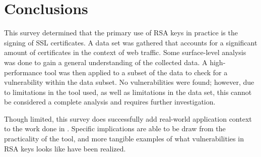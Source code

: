 \documentclass{acm_proc_article-sp}
\begin{document}
\section{Conclusions}
This survey determined that the primary use of RSA keys in practice is the
signing of SSL certificates. A data set was gathered that accounts for a
significant amount of certificates in the context of web traffic. Some
surface-level analysis was done to gain a general understanding of the
collected data. A high-performance tool was then applied to a subset of the
data to check for a vulnerability within the data subset. No vulnerabilities
were found; however, due to limitations in the tool used, as well as
limitations in the data set, this cannot be considered a complete analysis
and requires further investigation.

\balancecolumns
Though limited, this survey does successfully add real-world application
context to the work done in \cite{scharfglass2012breaking}. Specific
implications are able to be draw from the practicality of the tool, and more
tangible examples of what vulnerabilities in RSA keys looks like have been
realized.



\end{document}
